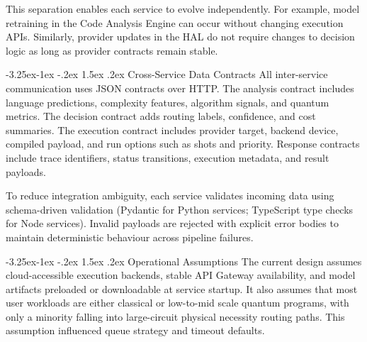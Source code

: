 \documentclass[12pt,a4paper]{report}
\makeatletter
\renewcommand\subsection{\@startsection{subsection}{2}{\z@}%
  {-3.25ex\@plus -1ex \@minus -.2ex}%
  {1.5ex \@plus .2ex}%
  {\normalfont\bfseries\fontsize{12pt}{16pt}\selectfont}}
\makeatother
\begin{document}
This separation enables each service to evolve independently. For example, model retraining in the Code Analysis Engine can occur without changing execution APIs. Similarly, provider updates in the HAL do not require changes to decision logic as long as provider contracts remain stable.

\subsection{Cross-Service Data Contracts}
All inter-service communication uses JSON contracts over HTTP. The analysis contract includes language predictions, complexity features, algorithm signals, and quantum metrics. The decision contract adds routing labels, confidence, and cost summaries. The execution contract includes provider target, backend device, compiled payload, and run options such as shots and priority. Response contracts include trace identifiers, status transitions, execution metadata, and result payloads.

To reduce integration ambiguity, each service validates incoming data using schema-driven validation (Pydantic for Python services; TypeScript type checks for Node services). Invalid payloads are rejected with explicit error bodies to maintain deterministic behaviour across pipeline failures.

\subsection{Operational Assumptions}
The current design assumes cloud-accessible execution backends, stable API Gateway availability, and model artifacts preloaded or downloadable at service startup. It also assumes that most user workloads are either classical or low-to-mid scale quantum programs, with only a minority falling into large-circuit physical necessity routing paths. This assumption influenced queue strategy and timeout defaults.
\end{document}
